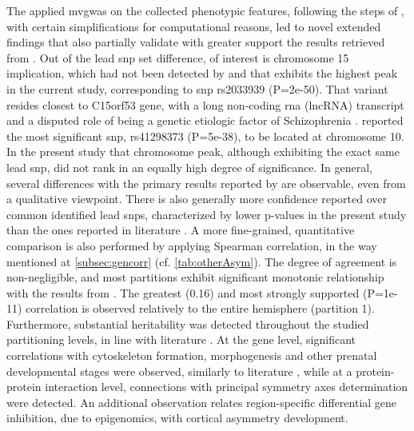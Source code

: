 The applied \ac{mvgwas} on the collected phenotypic features, following the steps of \citet{Naqvi2021}, with certain simplifications for computational reasons, led to novel extended findings that also partially validate with greater support the results retrieved from \citet{Sha2021}. Out of the lead \ac{snp} set difference, of interest is chromosome 15 implication, which had not been detected by \citet{Sha2021} and that exhibits the highest peak in the current study, corresponding to \ac{snp} rs2033939 (P=2e-50). That variant resides closest to C15orf53 gene, with a long non-coding \ac{rna} (lncRNA) transcript and a disputed role of being a genetic etiologic factor of Schizophrenia \cite{Kranz2012}. \citet{Sha2021} reported the most significant \ac{snp}, rs41298373 (P=5e-38), to be located at chromosome 10. In the present study that chromosome peak, although exhibiting the exact same lead \ac{snp}, did not rank in an equally high degree of significance. In general, several differences with the primary results reported by \citet{Sha2021} are observable, even from a qualitative viewpoint. There is also generally more confidence reported over common identified lead \acp{snp}, characterized by lower p-values in the present study than the ones reported in literature \cite{Sha2021}. A more fine-grained, quantitative comparison is also performed by applying Spearman correlation, in the way mentioned at \autoref{subsec:gencorr} \cite{Naqvi2021} (cf. \autoref{tab:otherAsym}). The degree of agreement is non-negligible, and most partitions exhibit significant monotonic relationship with the results from \citet{Sha2021}. The greatest (0.16) and most strongly supported (P=1e-11) correlation is observed relatively to the entire hemisphere (partition 1). Furthermore, substantial heritability was detected throughout the studied partitioning levels, in line with literature \cite{Sha2021}. At the gene level, significant correlations with cytoskeleton formation, morphogenesis and other prenatal developmental stages were observed, similarly to literature \cite{Sha2021}, while at a protein-protein interaction level, connections with principal symmetry axes determination were detected. An additional observation relates region-specific differential gene inhibition, due to epigenomics, with cortical asymmetry development. 

